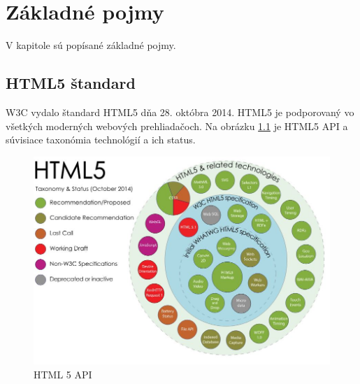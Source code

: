 \chapter{Základné pojmy}
V kapitole sú popísané základné pojmy. 

\section{\acs{HTML}5 štandard}

\ac{W3C} vydalo štandard HTML5 dňa 28. októbra 2014. 
HTML5 je podporovaný vo všetkých moderných webových prehliadačoch. 
Na obrázku \ref{fig:obrazokHTML} je HTML5 API a súvisiace taxonómia technológií a ich status. 

\begin{center}
	\begin{figure}[hp]
\centering
\includegraphics[width=0.7\linewidth]{obrazky/obrazokHTML}
\caption{HTML 5 API}
\label{fig:obrazokHTML}
\end{figure}
\end{center}








